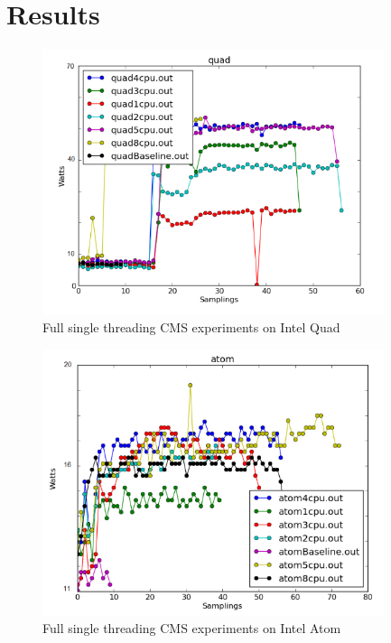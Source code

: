 \section{Results}

\begin{figure}[h!]
  \centering
    \includegraphics[width=100mm]{"img/aalto/aalto_total_quad"}
    \caption{Full single threading CMS experiments on Intel Quad}
    \label{fig:aalto_quad_clamp}
\end{figure}

\begin{figure}[h!]
  \centering
    \includegraphics[width=100mm]{"img/aalto/aalto_total_atom"}
    \caption{Full single threading CMS experiments on Intel Atom}
    \label{fig:aalto_atom_clamp}
\end{figure}


